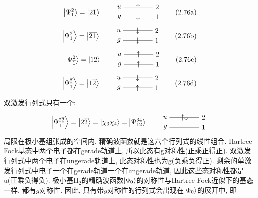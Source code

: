 \begin{align*}
\ket{\Psi_1^2}=\ket{2\bar{1}}\qquad
\begin{tikzpicture}[baseline={([yshift=-.8ex]current bounding box.center)}]
\draw (0,0)node[left] {$u$}--node[pos=0.5]{$\uparrow$}(1.5,0)node[right]{2};
\draw (0,-0.5)node[left] {$g$}--node[pos=0.5]{$\downarrow$}(1.5,-0.5)node[right]{1};
\end{tikzpicture}\tag*{(2.76a)}
\\
\ket{\Psi_1^{\bar{2}}}=\ket{\bar{21}}\qquad
\begin{tikzpicture}[baseline={([yshift=-.8ex]current bounding box.center)}]
\draw (0,0)node[left] {$u$}--node[pos=0.5]{$\downarrow$}(1.5,0)node[right]{2};
\draw (0,-0.5)node[left] {$g$}--node[pos=0.5]{$\downarrow$}(1.5,-0.5)node[right]{1};
\end{tikzpicture}\tag*{(2.76b)}
\\
\ket{\Psi_{\bar{1}}^2}=\ket{{12}}\qquad
\begin{tikzpicture}[baseline={([yshift=-.8ex]current bounding box.center)}]
\draw (0,0)node[left] {$u$}--node[pos=0.5]{$\uparrow$}(1.5,0)node[right]{2};
\draw (0,-0.5)node[left] {$g$}--node[pos=0.5]{$\uparrow$}(1.5,-0.5)node[right]{1};
\end{tikzpicture}\tag*{(2.76c)}
\\
\ket{\Psi_{\bar{1}}^{\bar{2}}}=\ket{1\bar{2}}\qquad
\begin{tikzpicture}[baseline={([yshift=-.8ex]current bounding box.center)}]
\draw (0,0)node[left] {$u$}--node[pos=0.5]{$\downarrow$}(1.5,0)node[right]{2};
\draw (0,-0.5)node[left] {${g}$}--node[pos=0.5]{$\uparrow$}(1.5,-0.5)node[right]{1};
\end{tikzpicture}\tag*{(2.76d)}
\addtocounter{equation}{1}
\end{align*}
双激发行列式只有一个:
\begin{equation}
\ket{\Psi_{1\bar{1}}^{2\bar{2}}}=\ket{2\bar{2}}=\ket{\chi_3\chi_4}=\ket{\Psi_{12}^{34}}\qquad
\begin{tikzpicture}[baseline={([yshift=-.8ex]current bounding box.center)}]
\draw (0,0)node[left] {$u$}--node[pos=0.5]{$\uparrow\downarrow$}(1.5,0)node[right]{2};
\draw (0,-0.5)node[left] {$g$}--(1.5,-0.5)node[right]{1};
\end{tikzpicture}
\end{equation}
局限在极小基组张成的空间内, 精确波函数就是这六个行列式的线性组合. Hartree-Fock基态中两个电子都在gerade轨道上, 所以此态有g对称性(正乘正得正). 双激发行列式中两个电子在ungerade轨道上, 此态对称性也为g(负乘负得正). 剩余的单激发行列式中电子一个在gerade轨道一个在ungerade轨道, 因此这些态对称性都是u(正乘负得负). 极小基$\mathrm{H}_2$的精确波函数$\Ket{\Phi_0}$的对称性与Hartree-Fock近似下的基态一样, 都有$g$对称性. 因此, 只有带$g$对称性的行列式会出现在$\Ket{\Phi_0}$的展开中, 即
